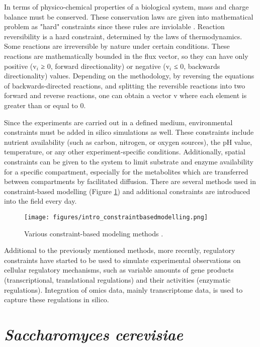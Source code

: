 In terms of physico-chemical properties of a biological system, mass and charge balance must be conserved. These conservation laws are given into mathematical problem as "hard" constraints since these rules are inviolable \cite{price2004genome}. Reaction reversibility is a hard constraint, determined by the laws of thermodynamics. Some reactions are irreversible by nature under certain conditions. These reactions are mathematically bounded in the flux vector, so they can have only positive (v$_i$ ≥ 0, forward directionality) or negative (v$_i$ ≤ 0, backwards directionality) values. Depending on the methodology, by reversing the equations of backwards-directed reactions, and splitting the reversible reactions into two forward and reverse reactions, one can obtain a vector v where each element is greater than or equal to 0.

Since the experiments are carried out in a defined medium, environmental constraints must be added in silico simulations as well. These constraints include nutrient availability (such as carbon, nitrogen, or oxygen sources), the pH value, temperature, or any other experiment-specific conditions. Additionally, spatial constraints can be given to the system to limit substrate and enzyme availability for a specific compartment, especially for the metabolites which are transferred between compartments by facilitated diffusion. There are several methods used in constraint-based modelling (Figure \ref{fig:intro_constraintbasedmodelling}) and additional constraints are introduced into the field every day.
\begin{figure}[H]
\begin{center}
\texttt{[image: figures/intro\_constraintbasedmodelling.png]}
\end{center}
\caption[Various constraint-based modeling methods \cite{lewis2012constraining}.]{Various constraint-based modeling methods \cite{lewis2012constraining}.}
\label{fig:intro_constraintbasedmodelling}
\end{figure}
Additional to the previously mentioned methods, more recently, regulatory constraints have started to be used to simulate experimental observations on cellular regulatory mechanisms, such as variable amounts of gene products (transcriptional, translational regulations) and their activities (enzymatic regulations). Integration of omics data, mainly transcriptome data, is used to capture these regulations in silico.


\section{\emph{Saccharomyces cerevisiae}}

